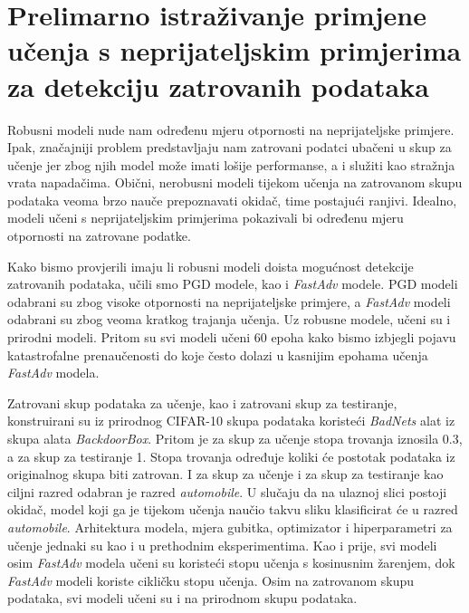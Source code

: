 \documentclass[times, utf8, zavrsni, numeric]{fer}
\begin{document}


\section{Prelimarno istraživanje primjene učenja s neprijateljskim primjerima za detekciju zatrovanih podataka}

Robusni modeli nude nam određenu mjeru otpornosti na neprijateljske primjere. 
Ipak, značajniji problem predstavljaju nam zatrovani podatci ubačeni u skup za učenje jer zbog njih model može imati lošije performanse, a i služiti kao stražnja vrata napadačima.
Obični, nerobusni modeli tijekom učenja na zatrovanom skupu podataka veoma brzo nauče prepoznavati okidač, time postajući ranjivi.
Idealno, modeli učeni s neprijateljskim primjerima pokazivali bi određenu mjeru otpornosti na zatrovane podatke.

Kako bismo provjerili imaju li robusni modeli doista mogućnost detekcije zatrovanih podataka,
učili smo PGD modele, kao i \textit{FastAdv} modele. PGD modeli odabrani su zbog visoke otpornosti na neprijateljske primjere,
a \textit{FastAdv} modeli odabrani su zbog veoma kratkog trajanja učenja. Uz robusne modele, učeni su i prirodni modeli.
Pritom su svi modeli učeni 60 epoha kako bismo izbjegli pojavu katastrofalne prenaučenosti do koje često dolazi u kasnijim epohama učenja \textit{FastAdv} modela. 

\pagebreak

Zatrovani skup podataka za učenje, kao i zatrovani skup za testiranje, konstruirani su iz prirodnog CIFAR-10 skupa podataka koristeći \textit{BadNets} 
alat iz skupa alata \textit{BackdoorBox}. Pritom je za skup za učenje stopa trovanja iznosila 0.3, a za skup za testiranje 1. Stopa trovanja određuje koliki će postotak podataka iz originalnog skupa biti zatrovan.
I za skup za učenje i za skup za testiranje kao ciljni razred odabran je razred \textit{automobile}. 
U slučaju da na ulaznoj slici postoji okidač, model koji ga je tijekom učenja naučio takvu sliku klasificirat će u razred \textit{automobile}.
Arhitektura modela, mjera gubitka, optimizator i hiperparametri za učenje jednaki su kao i u prethodnim eksperimentima. 
Kao i prije, svi modeli osim \textit{FastAdv} modela učeni su koristeći stopu učenja s kosinusnim žarenjem, dok \textit{FastAdv} modeli koriste cikličku stopu učenja.
Osim na zatrovanom skupu podataka, svi modeli učeni su i na prirodnom skupu podataka.
\end{document}
